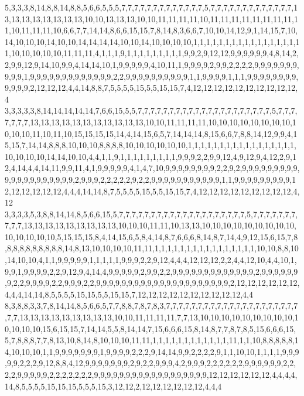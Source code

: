 5,3,3,3,8,14,8,8,14,8,8,5,6,6,5,5,5,7,7,7,7,7,7,7,7,7,7,7,7,7,5,7,7,7,7,7,7,7,7,7,7,7,7,7,13,13,13,13,13,13,13,13,10,10,13,13,13,10,10,11,11,11,11,10,11,11,11,11,11,11,11,11,11,10,11,11,11,10,6,6,7,7,14,14,8,6,6,15,15,7,8,14,8,3,6,6,7,10,10,14,12,9,1,14,15,7,10,14,10,10,10,14,10,10,14,14,14,14,10,10,14,10,10,10,10,1,1,1,1,1,1,1,1,1,1,1,1,1,1,1,1,11,10,10,10,10,10,11,11,11,4,1,1,1,9,1,1,1,1,1,1,1,1,1,9,9,2,9,12,12,9,9,9,9,9,9,4,8,14,2,2,9,9,12,9,14,10,9,9,4,14,14,10,1,9,9,9,9,9,4,10,11,1,9,9,9,9,2,9,9,2,2,2,2,9,9,9,9,9,9,9,9,9,9,1,9,9,9,9,9,9,9,9,9,9,9,9,9,2,2,9,9,9,9,9,9,9,9,9,9,1,1,9,9,9,9,1,1,1,9,9,9,9,9,9,9,9,9,9,9,9,2,12,12,12,4,4,14,8,8,7,5,5,5,5,15,5,5,15,15,7,4,12,12,12,12,12,12,12,12,12,12,4
3,3,3,3,3,8,14,14,14,14,14,7,6,6,15,5,5,7,7,7,7,7,7,7,7,7,7,7,7,7,7,7,7,7,7,7,7,7,5,7,7,7,7,7,7,7,13,13,13,13,13,13,13,13,13,13,13,10,10,11,11,11,11,10,10,10,10,10,10,10,10,10,10,10,11,10,11,10,15,15,15,15,14,4,14,15,6,5,7,14,14,14,8,15,6,6,7,8,8,14,12,9,9,4,15,15,7,14,14,8,8,8,10,10,10,8,8,8,8,10,10,10,10,10,10,1,1,1,1,1,1,1,1,1,1,1,1,1,1,1,1,1,10,10,10,10,14,14,10,10,4,4,1,1,9,1,1,1,1,1,1,1,1,1,9,9,9,2,2,9,9,12,4,9,12,9,4,12,2,9,12,4,14,4,4,14,11,9,9,11,4,1,9,9,9,9,9,4,1,4,7,10,9,9,9,9,9,9,9,9,2,2,9,2,9,9,9,9,9,9,9,9,9,9,9,9,9,9,9,9,9,9,9,9,2,9,9,9,2,2,2,2,2,9,2,2,9,9,9,9,9,9,9,9,9,9,9,1,1,9,9,9,9,9,9,9,9,9,12,12,12,12,12,12,4,4,4,14,14,8,7,5,5,5,5,15,5,5,15,15,7,4,12,12,12,12,12,12,12,12,12,4,12
3,3,3,3,5,3,8,8,14,14,8,5,6,6,15,5,7,7,7,7,7,7,7,7,7,7,7,7,7,7,7,7,7,7,7,7,5,7,7,7,7,7,7,7,7,7,7,13,13,13,13,13,13,13,13,13,10,10,10,11,11,10,13,13,10,10,10,10,10,10,10,10,10,10,10,10,10,10,5,15,15,15,8,4,14,15,6,5,8,4,14,8,7,6,6,6,8,14,8,7,14,4,9,12,15,6,15,7,8,8,8,8,8,8,8,8,8,8,14,8,13,10,10,10,10,11,11,1,1,1,1,1,1,1,1,1,1,1,1,1,1,1,1,10,10,8,8,10,14,10,10,4,1,1,9,9,9,9,9,1,1,1,1,1,9,9,9,2,2,9,12,4,4,4,12,12,12,2,2,4,4,12,10,4,4,10,1,9,9,1,9,9,9,9,2,2,9,12,9,4,14,4,9,9,9,9,9,2,9,9,2,2,9,9,9,9,9,9,9,9,9,9,9,9,9,2,9,9,9,9,9,9,9,2,2,9,9,9,9,2,2,9,9,9,2,2,9,9,9,9,9,9,9,9,9,9,9,9,9,9,9,9,9,9,9,9,9,2,12,12,12,12,12,12,4,4,4,14,14,8,5,5,5,5,15,15,5,5,15,15,7,12,12,12,12,12,12,12,12,12,12,4,4
8,3,8,8,3,3,7,8,14,14,8,5,6,6,5,7,7,8,8,7,8,7,8,3,7,7,7,7,7,7,7,7,7,7,7,7,7,7,7,7,7,7,7,7,7,7,7,13,13,13,13,13,13,13,13,13,10,10,11,11,11,11,7,7,13,10,10,10,10,10,10,10,10,10,10,10,10,10,15,6,15,15,7,14,14,5,5,8,14,14,7,15,6,6,6,15,8,14,8,7,7,8,7,8,5,15,6,6,6,15,5,7,8,8,8,7,7,8,13,10,8,14,8,10,10,10,11,11,1,1,1,1,1,1,1,1,1,1,1,1,11,1,1,10,8,8,8,8,8,14,10,10,10,1,1,9,9,9,9,9,9,9,1,9,9,9,9,2,2,2,9,14,14,9,9,2,2,2,2,9,1,1,10,10,1,1,1,1,9,9,9,9,9,2,2,2,9,12,8,8,4,12,9,9,9,9,9,9,9,2,9,2,2,9,9,9,4,2,9,9,9,2,2,2,2,2,2,9,9,9,9,9,9,2,2,2,2,9,9,9,9,9,2,2,2,2,2,2,2,9,9,9,9,9,9,9,9,9,9,9,9,9,9,9,9,9,9,12,12,12,12,12,12,4,4,4,4,14,8,5,5,5,5,15,15,15,5,5,5,15,3,12,12,2,12,12,12,12,12,12,4,4,4
